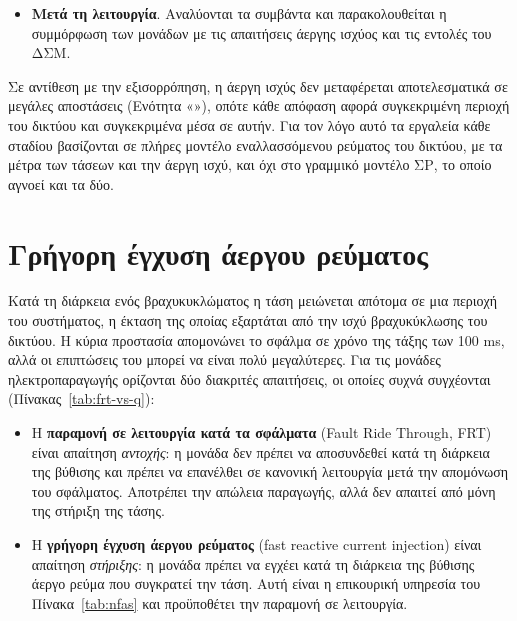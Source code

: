 \begin{itemize}
      ανάλυση απρόβλεπτων συμβάντων ελέγχει τις τάσεις μετά από κάθε συμβάν του καταλόγου και
      η βέλτιστη ροή ισχύος, ως τριτεύουσα ρύθμιση, προτείνει τιμές αναφοράς. Οι χειριστές
      εκδίδουν εντολές για τις τάσεις αναφοράς ή την άεργη ισχύ των μονάδων, ζευγνύουν πηνία και
      πυκνωτές, μεταβάλλουν τις τιμές αναφοράς των μεταγωγέων λήψεων και, όταν απαιτείται,
      αλλάζουν την τοπολογία. Παράλληλα λειτουργούν συνεχώς η πρωτεύουσα και, όπου υπάρχει, η
      δευτερεύουσα ρύθμιση, ενώ σε κατάσταση έκτακτης ανάγκης εφαρμόζονται τα μέτρα του σχεδίου
      άμυνας του συστήματος.
\item \textbf{Μετά τη λειτουργία}. Αναλύονται τα συμβάντα και παρακολουθείται η συμμόρφωση των
      μονάδων με τις απαιτήσεις άεργης ισχύος και τις εντολές του ΔΣΜ.
\end{itemize}

Σε αντίθεση με την εξισορρόπηση, η άεργη ισχύς δεν μεταφέρεται αποτελεσματικά σε μεγάλες
αποστάσεις (Ενότητα «»), οπότε κάθε απόφαση αφορά συγκεκριμένη περιοχή του
δικτύου και συγκεκριμένα μέσα σε αυτήν. Για τον λόγο αυτό τα εργαλεία κάθε σταδίου βασίζονται
σε πλήρες μοντέλο εναλλασσόμενου ρεύματος του δικτύου, με τα μέτρα των τάσεων και την άεργη
ισχύ, και όχι στο γραμμικό μοντέλο ΣΡ, το οποίο αγνοεί και τα δύο.

\section{Γρήγορη έγχυση άεργου ρεύματος}
\label{sec:frt}

Κατά τη διάρκεια ενός βραχυκυκλώματος η τάση μειώνεται απότομα σε μια περιοχή του συστήματος,
η έκταση της οποίας εξαρτάται από την ισχύ βραχυκύκλωσης του δικτύου. Η κύρια προστασία
απομονώνει το σφάλμα σε χρόνο της τάξης των 100 ms, αλλά οι επιπτώσεις του μπορεί να είναι
πολύ μεγαλύτερες. Για τις μονάδες ηλεκτροπαραγωγής ορίζονται δύο διακριτές απαιτήσεις, οι
οποίες συχνά συγχέονται (Πίνακας~\ref{tab:frt-vs-q}):

\begin{itemize}
\item Η \textbf{παραμονή σε λειτουργία κατά τα σφάλματα} (Fault Ride Through, FRT) είναι
      απαίτηση \emph{αντοχής}: η μονάδα δεν πρέπει να αποσυνδεθεί κατά τη διάρκεια της
      βύθισης και πρέπει να επανέλθει σε κανονική λειτουργία μετά την απομόνωση του σφάλματος.
      Αποτρέπει την απώλεια παραγωγής, αλλά δεν απαιτεί από μόνη της στήριξη της τάσης.
\item Η \textbf{γρήγορη έγχυση άεργου ρεύματος} (fast reactive current injection) είναι
      απαίτηση \emph{στήριξης}: η μονάδα πρέπει να εγχέει κατά τη διάρκεια της βύθισης άεργο
      ρεύμα που συγκρατεί την τάση. Αυτή είναι η επικουρική υπηρεσία του
      Πίνακα~\ref{tab:nfas} και προϋποθέτει την παραμονή σε λειτουργία.
\end{itemize}

